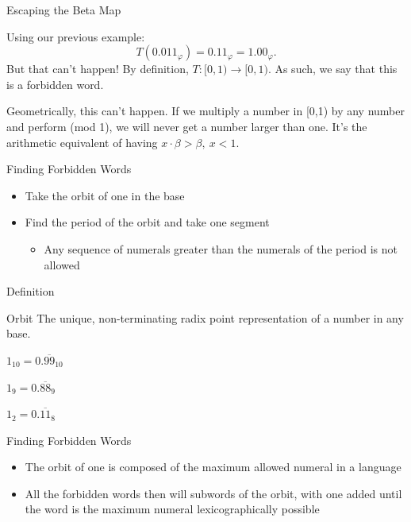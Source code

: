 \documentclass{beamer}
\begin{document}
\begin{frame}{Escaping the Beta Map}
  \begin{example}
    Using our previous example:
    $$T(0.011_\varphi)=0.11_\varphi=1.00_\varphi.$$ \pause
    But that can't happen! By definition, $T:[0,1)\to[0,1)$. As such, we say that this is a forbidden word. \pause

    Geometrically, this can't happen. If we multiply a number in [0,1) by any number and perform (mod 1), we will never get a number larger than one. It's the arithmetic equivalent of having $x\cdot\beta > \beta,\ x<1$.
  \end{example}
\end{frame}

\begin{frame}{Finding Forbidden Words}
  \begin{itemize}
    \item Take the orbit of one in the base \pause
    \item Find the period of the orbit and take one segment \pause
    \begin{itemize}
      \item Any sequence of numerals greater than the numerals of the period is not allowed
    \end{itemize}
  \end{itemize}
\end{frame}

\begin{frame}{Definition}
  \begin{block}{Orbit}
    The unique, non-terminating radix point representation of a number in any base.
  \end{block}\pause

  \begin{example} \pause
    $1_{10} = 0.\overline{99}_{10}$ \pause

    $1_{9} = 0.\overline{88}_{9}$ \pause

    $1_{2} = 0.\overline{11}_{8}$
  \end{example}
\end{frame}

\begin{frame}{Finding Forbidden Words}
  \begin{itemize}
    \item The orbit of one is composed of the maximum allowed numeral in a language \pause
    \item All the forbidden words then will subwords of the orbit, with one added until the word is the maximum numeral lexicographically possible
  \end{itemize}
\end{frame}
\end{document}
